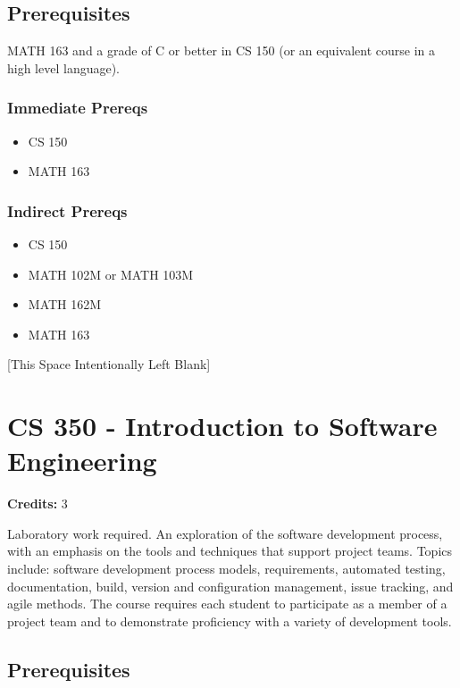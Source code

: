\documentclass[]{article}
\providecommand{\tightlist}{%
  \setlength{\itemsep}{0pt}\setlength{\parskip}{0pt}}
\newcommand{\pagebreakhere}{
\vspace*{\fill}
\begin{center}
[This Space Intentionally Left Blank]
\end{center}
\vspace*{\fill}
\newpage
}
\begin{document}
\subsection{Prerequisites}\label{prerequisites-16}

MATH 163 and a grade of C or better in CS 150 (or an equivalent course
in a high level language).

\subsubsection{Immediate Prereqs}\label{immediate-prereqs-11}

\begin{itemize}
\tightlist
\item
  CS 150
\item
  MATH 163
\end{itemize}

\subsubsection{Indirect Prereqs}\label{indirect-prereqs-11}

\begin{itemize}
\tightlist
\item
  CS 150
\item
  MATH 102M or MATH 103M
\item
  MATH 162M
\item
  MATH 163
\end{itemize}

\pagebreakhere
\section{CS 350 - Introduction to Software
Engineering}\label{cs-350---introduction-to-software-engineering}

\textbf{Credits:} 3

Laboratory work required. An exploration of the software development
process, with an emphasis on the tools and techniques that support
project teams. Topics include: software development process models,
requirements, automated testing, documentation, build, version and
configuration management, issue tracking, and agile methods. The course
requires each student to participate as a member of a project team and
to demonstrate proficiency with a variety of development tools.

\subsection{Prerequisites}\label{prerequisites-17}
\end{document}
